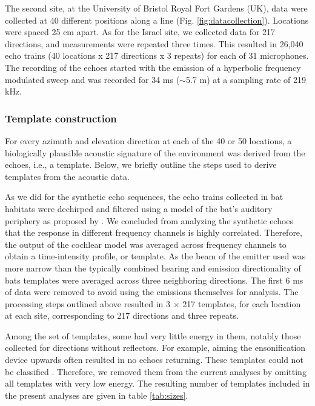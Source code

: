 \documentclass[preprint,5p]{elsarticle}
\begin{document}
The second site, at the University of Bristol Royal Fort Gardens (UK), data were collected at 40 different positions along a line (Fig. \ref{fig:datacollection}). Locations were spaced 25 cm apart. As for the Israel site, we collected data for 217 directions, and measurements were repeated three times. This resulted in 26,040 echo trains (40 locations x 217 directions x 3 repeats) for each of 31 microphones. The recording of the echoes started with the emission of a hyperbolic frequency modulated sweep and was recorded for 34 ms ($\sim$5.7 m) at a sampling rate of 219 kHz. 

\subsubsection{Template construction}

For every azimuth and elevation direction at each of the  40 or 50 locations, a biologically plausible acoustic signature of the environment was derived from the echoes, i.e., a template. Below, we briefly outline the steps used to derive templates from the acoustic data.

As we did for the synthetic echo sequences, the echo trains collected in bat habitats were dechirped and filtered using a model of the bat's auditory periphery as proposed by \citet{Wiegrebe2008}. We concluded from analyzing the synthetic echoes that the response in different frequency channels is highly correlated. Therefore, the output of the cochlear model was averaged across frequency channels to obtain a time-intensity profile, or template. As the beam of the emitter used was more narrow than the typically combined hearing and emission directionality of bats \citep{Vanderelst2010a,Reijniers2010,Jakobsen2012} templates were averaged across three neighboring directions. The first 6 ms of data were removed to avoid using the emissions themselves for analysis. The processing steps outlined above resulted in 3 $\times$ 217 templates, for each location at each site, corresponding to 217 directions and three repeats.

Among the set of templates, some had very little energy in them, notably those collected for directions without reflectors. For example, aiming the ensonification device upwards often resulted in no echoes returning. These templates could not be classified \citep{Vanderelst2016}. Therefore, we removed them from the current analyses by omitting all templates with very low energy. The resulting number of templates included in the present analyses are given in table \ref{tab:sizes}.
\end{document}
